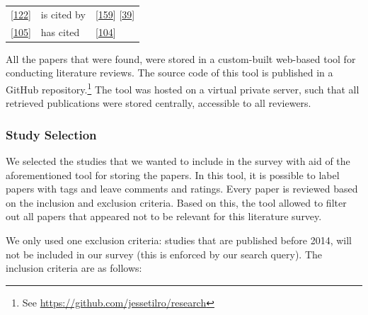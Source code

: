 \documentclass[]{book}
\let\rmarkdownfootnote\footnote%
\def\footnote{\protect\rmarkdownfootnote}
\begin{document}
\begin{longtable}[]{@{}lll@{}}
\begin{minipage}[t]{0.23\columnwidth}\raggedright\strut
{[}\protect\hyperlink{ref-mantyla2015a}{122}{]}\strut
\end{minipage} & \begin{minipage}[t]{0.18\columnwidth}\raggedright\strut
is cited by\strut
\end{minipage} & \begin{minipage}[t]{0.25\columnwidth}\raggedright\strut
{[}\protect\hyperlink{ref-rodriguez2017a}{159}{]}
{[}\protect\hyperlink{ref-cesar2017a}{39}{]}\strut
\end{minipage}\tabularnewline
\begin{minipage}[t]{0.23\columnwidth}\raggedright\strut
{[}\protect\hyperlink{ref-laukkanen2018a}{105}{]}\strut
\end{minipage} & \begin{minipage}[t]{0.18\columnwidth}\raggedright\strut
has cited\strut
\end{minipage} & \begin{minipage}[t]{0.25\columnwidth}\raggedright\strut
{[}\protect\hyperlink{ref-laukkanen2017a}{104}{]}\strut
\end{minipage}\tabularnewline
\bottomrule
\end{longtable}

All the papers that were found, were stored in a custom-built web-based
tool for conducting literature reviews. The source code of this tool is
published in a GitHub repository.\footnote{See
  \url{https://github.com/jessetilro/research}} The tool was hosted on a
virtual private server, such that all retrieved publications were stored
centrally, accessible to all reviewers.

\subsubsection{Study Selection}\label{study-selection}

We selected the studies that we wanted to include in the survey with aid
of the aforementioned tool for storing the papers. In this tool, it is
possible to label papers with tags and leave comments and ratings. Every
paper is reviewed based on the inclusion and exclusion criteria. Based
on this, the tool allowed to filter out all papers that appeared not to
be relevant for this literature survey.

We only used one exclusion criteria: studies that are published before
2014, will not be included in our survey (this is enforced by our search
query). The inclusion criteria are as follows:
\end{document}
